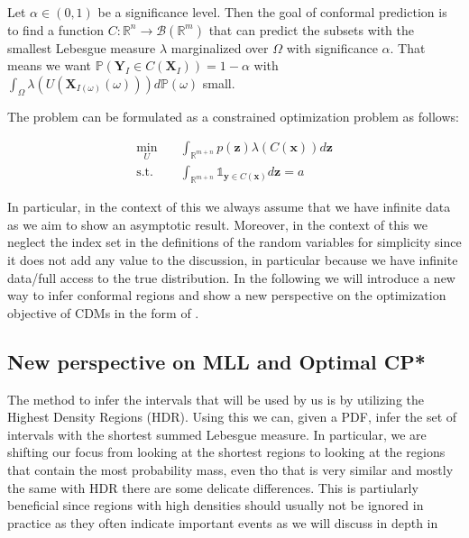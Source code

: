 Let $\alpha \in (0,1)$ be a significance level. Then the goal of conformal prediction is to find a function $C : \mathbb{R}^n \to \mathcal{B}(\mathbb{R}^m)$ that can predict the subsets with the smallest Lebesgue measure $\lambda$ marginalized over $\Omega$ with significance $\alpha$. That means we want $\mathbb{P}(\mathbf{Y}_I \in C(\mathbf{X}_I)) = 1 - \alpha$ with $\int_{\Omega}\lambda(U(\mathbf{X}_{I(\omega)}(\omega))) d\mathbb{P}(\omega)$ small.

The problem can be formulated as a constrained optimization problem as follows:

\begin{align}
    \min_U \quad      & \int_{\mathbb{R}^{m + n}} p(\mathbf{z})
    \lambda(C(\mathbf{x}))
    d\mathbf{z}
    \\
    \text{s.t.} \quad & \int_{\mathbb{R}^{m + n}} \mathds{1}_{\mathbf{y} \in
    C(\mathbf{x})} d\mathbf{z} = a
\end{align}

In particular, in the context of this  we always assume that we have infinite data as we aim to show an asymptotic result. Moreover, in the context of this  we neglect the index set in the definitions of the random variables for simplicity since it does not add any value to the discussion, in particular because we have infinite data/full access to the true distribution. In the following  we will introduce a new way to infer conformal regions and show a new perspective on the optimization objective of CDMs in the form of .

\subsection{New perspective on MLL and Optimal CP*}\label{sec:optimal_cp_proofs}

The method to infer the intervals that will be used by us is by utilizing the Highest Density Regions (HDR). Using this we can, given a PDF, infer the set of intervals with the shortest summed Lebesgue measure. In particular, we are shifting our focus from looking at the shortest regions to looking at the regions that contain the most probability mass, even tho that is very similar and mostly the same with HDR there are some delicate differences. This is partiularly beneficial since regions with high densities should usually not be ignored in practice as they often indicate important events as we will discuss in depth in 

